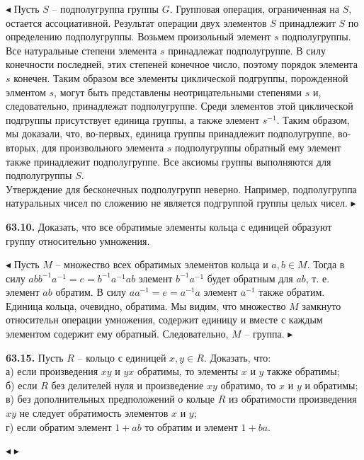 \documentclass[a5paper,10pt]{article}
\begin{document}
\medskip
\noindent
$\blacktriangleleft$ Пусть $S$ -- подполугруппа группы $G$. Групповая операция, ограниченная на $S$, остается ассоциативной. Результат операции двух элементов $S$ принадлежит $S$ по определению подполугруппы. Возьмем произольный элемент $s$ подполугруппы. Все натуральные степени элемента $s$ принадлежат подполугруппе. В силу конечности последней, этих степеней конечное число, поэтому порядок элемента $s$ конечен. Таким образом все элементы циклической подгруппы, порожденной элментом $s$, могут быть представлены неотрицательными степенями $s$ и, следовательно, принадлежат подполугруппе. Среди элементов этой циклической подгруппы присутствует единица группы, а также элемент $s^{-1}$. Таким образом, мы доказали, что, во-первых, единица группы принадлежит подполугруппе, во-вторых, для произвольного элемента $s$ подполугруппы обратный ему элемент также принадлежит подполугруппе. Все аксиомы группы выполняются для подполугруппы $S$.\\[10pt]
Утверждение для бесконечных подполугрупп неверно. Например, подполугруппа натуральных чисел по сложению не является подгруппой группы целых чисел.
$\blacktriangleright$

\bigskip
\noindent
{\bf 63.10.} Доказать, что все обратимые элементы кольца с единицей образуют группу относительно умножения.

\medskip
\noindent
$\blacktriangleleft$ Пусть $M$ -- множество всех обратимых элементов кольца и $a,b\in M$. Тогда в силу $abb^{-1}a^{-1}=e=b^{-1}a^{-1}ab$ элемент $b^{-1}a^{-1}$ будет обратным для $ab$, т. е. элемент $ab$ обратим. В силу $aa^{-1}=e=a^{-1}a$ элемент $a^{-1}$ также обратим. Единица кольца, очевидно, обратима. Мы видим, что множество $M$ замкнуто относительн операции умножения, содержит единицу и вместе с каждым элементом содержит ему обратный. Следовательно, $M$ -- группа.
$\blacktriangleright$

\bigskip
\noindent
{\bf 63.15.} Пусть $R$ -- кольцо с единицей $x,y\in R$. Доказать, что:\\
а) если произведения $xy$ и $yx$ обратимы, то элементы $x$ и $y$ также обратимы;\\
б) если $R$ без делителей нуля и произведение $xy$ обратимо, то $x$ и $y$ и обратимы;\\
в) без дополнительных предположений о кольце $R$ из обратимости произведения $xy$ не следует обратимость элементов $x$ и $y$;\\
г) если обратим элемент $1+ab$ то обратим и элемент $1+ba$.

\medskip
\noindent
$\blacktriangleleft$ $\blacktriangleright$
\end{document}
